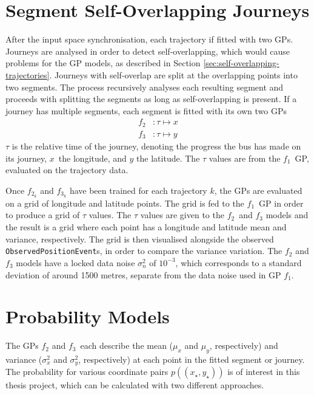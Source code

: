 \section{Segment Self-Overlapping Journeys} \label{sec:segment-self-overlapping-journeys}
After the input space synchronisation, each trajectory if fitted with two GPs.
Journeys are analysed in order to detect self-overlapping, which would cause problems for the GP models, as described in Section \ref{sec:self-overlapping-trajectories}.
Journeys with self-overlap are split at the overlapping points into two segments.
The process recursively analyses each resulting segment and proceeds with splitting the segments as long as self-overlapping is present.
If a journey has multiple segments, each segment is fitted with its own two GPs
\begin{align}
    f_2&: \tau \longmapsto x \\
    f_3&: \tau \longmapsto y
\end{align}
$\tau$ is the relative time of the journey, denoting the progress the bus has made on its journey, $x$ the longitude, and $y$ the latitude.
The $\tau$ values are from the $f_1$ GP, evaluated on the trajectory data.

Once $f_{2_k}$ and $f_{3_k}$ have been trained for each trajectory $k$, the GPs are evaluated on a grid of longitude and latitude points.
The grid is fed to the $f_1$ GP in order to produce a grid of $\tau$ values.
The $\tau$ values are given to the $f_2$ and $f_3$ models and the result is a grid where each point has a longitude and latitude mean and variance, respectively.
The grid is then visualised alongside the observed \texttt{ObservedPositionEvent}s, in order to compare the variance variation.
The $f_2$ and $f_3$ models have a locked data noise $\sigma^2_n$ of $10^{-3}$, which corresponds to a standard deviation of around 1500 metres, separate from the data noise used in GP $f_1$.

\section{Probability Models} \label{sec:probability-models}
The GPs $f_2$ and $f_3$ each describe the mean ($\mu_x$ and $\mu_y$, respectively) and variance ($\sigma_x^2$ and $\sigma_y^2$, respectively) at each point in the fitted segment or journey.
The probability for various coordinate pairs $p((x_\star,y_\star))$ is of interest in this thesis project, which can be calculated with two different approaches.

